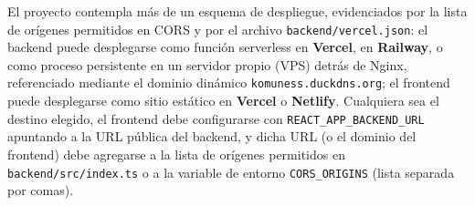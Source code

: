 El proyecto contempla más de un esquema de despliegue, evidenciados por la lista de orígenes permitidos en CORS y por el archivo \texttt{backend/vercel.json}: el backend puede desplegarse como función serverless en \textbf{Vercel}, en \textbf{Railway}, o como proceso persistente en un servidor propio (VPS) detrás de Nginx, referenciado mediante el dominio dinámico \texttt{komuness.duckdns.org}; el frontend puede desplegarse como sitio estático en \textbf{Vercel} o \textbf{Netlify}. Cualquiera sea el destino elegido, el frontend debe configurarse con \texttt{REACT\_APP\_BACKEND\_URL} apuntando a la URL pública del backend, y dicha URL (o el dominio del frontend) debe agregarse a la lista de orígenes permitidos en \texttt{backend/src/index.ts} o a la variable de entorno \texttt{CORS\_ORIGINS} (lista separada por comas).

